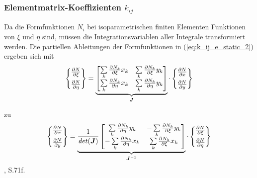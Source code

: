 \subsubsection{Elementmatrix-Koeffizienten $k_{ij}$}

Da die Formfunktionen $N_i$ bei isoparametrischen finiten Elementen Funktionen von $\xi$ und $\eta$ sind, müssen die Integrationsvariablen aller Integrale transformiert werden.  \newline
Die partiellen Ableitungen der Formfunktionen in (\ref{eq:k_ij_e_static_2}) ergeben sich mit 
\begin{equation}
\begin{Bmatrix}
\frac{\partial N}{\partial \xi} \\[2mm]
\frac{\partial N}{\partial \eta}
\end{Bmatrix} = 
\underbrace{
\begin{bmatrix}
\sum\limits_{k}\frac{\partial N_k}{\partial \xi}x_k & \sum\limits_{k}\frac{\partial N_k}{\partial \xi}y_k \\[2mm]
\sum\limits_{k}\frac{\partial N_k}{\partial \eta}x_k & \sum\limits_{k}\frac{\partial N_k}{\partial \eta}y_k
\end{bmatrix}}_{\boldsymbol{J}}\cdot
\begin{Bmatrix}
\frac{\partial N}{\partial x} \\[2mm]
\frac{\partial N}{\partial y}
\end{Bmatrix}
\end{equation}

zu 
\begin{equation}
\begin{Bmatrix}
\frac{\partial N}{\partial x} \\[2mm]
\frac{\partial N}{\partial y}
\end{Bmatrix} = 
\underbrace{
	\frac{1}{\mathit{det}(\boldsymbol{J})}\begin{bmatrix}
	 \sum\limits_{k}\frac{\partial N_k}{\partial \eta}y_k & -\sum\limits_{k}\frac{\partial N_k}{\partial \xi}y_k \\[2mm]
	-\sum\limits_{k}\frac{\partial N_k}{\partial \eta}x_k & \sum\limits_{k}\frac{\partial N_k}{\partial \xi}x_k
	\end{bmatrix}}_{\boldsymbol{J}^{-1}}
\cdot \begin{Bmatrix}
\frac{\partial N}{\partial \xi} \\[2mm]
\frac{\partial N}{\partial \eta}
\end{Bmatrix}
\end{equation}\cite{SMS_VO_skript}
, S.71f.\newline


